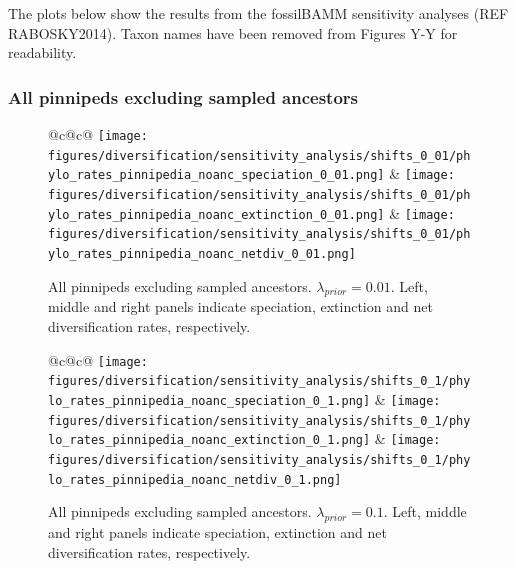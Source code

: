 \documentclass[a4paper, 12pt]{article}
\begin{document}
The plots below show the results from the fossilBAMM sensitivity analyses (REF RABOSKY2014). Taxon names have been removed from Figures Y-Y for readability.

\subsubsection{All pinnipeds excluding sampled ancestors}


\begin{figure}[H]
  \centering
  \begin{tabular}{@{}c@{\hspace{.5cm}}c@{}}
  \texttt{[image: figures/diversification/sensitivity\_analysis/shifts\_0\_01/phylo\_rates\_pinnipedia\_noanc\_speciation\_0\_01.png]} &
  \texttt{[image: figures/diversification/sensitivity\_analysis/shifts\_0\_01/phylo\_rates\_pinnipedia\_noanc\_extinction\_0\_01.png]} &
  \texttt{[image: figures/diversification/sensitivity\_analysis/shifts\_0\_01/phylo\_rates\_pinnipedia\_noanc\_netdiv\_0\_01.png]} \\
  \end{tabular}
  \caption{All pinnipeds excluding sampled ancestors. $\lambda_{prior} = 0.01$. Left, middle and right panels indicate speciation, extinction and net diversification rates, respectively.}
  \label{fig-noanc-0-01}
\end{figure}


\begin{figure}[H]
  \centering
  \begin{tabular}{@{}c@{\hspace{.5cm}}c@{}}
  \texttt{[image: figures/diversification/sensitivity\_analysis/shifts\_0\_1/phylo\_rates\_pinnipedia\_noanc\_speciation\_0\_1.png]} &
  \texttt{[image: figures/diversification/sensitivity\_analysis/shifts\_0\_1/phylo\_rates\_pinnipedia\_noanc\_extinction\_0\_1.png]} &
  \texttt{[image: figures/diversification/sensitivity\_analysis/shifts\_0\_1/phylo\_rates\_pinnipedia\_noanc\_netdiv\_0\_1.png]} \\
  \end{tabular}
  \caption{All pinnipeds excluding sampled ancestors. $\lambda_{prior} = 0.1$. Left, middle and right panels indicate speciation, extinction and net diversification rates, respectively.}
  \label{fig-noanc-0-1}
\end{figure}
\end{document}

